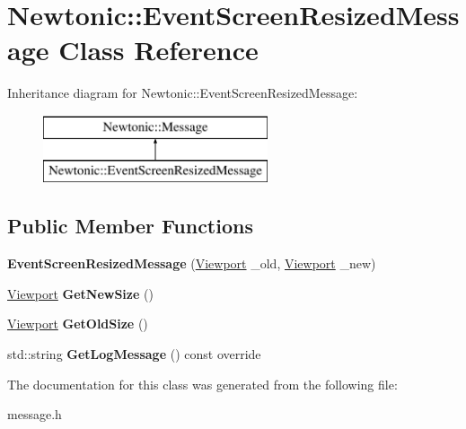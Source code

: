 \hypertarget{classNewtonic_1_1EventScreenResizedMessage}{}\section{Newtonic\+::Event\+Screen\+Resized\+Message Class Reference}
\label{classNewtonic_1_1EventScreenResizedMessage}
Inheritance diagram for Newtonic\+::Event\+Screen\+Resized\+Message\+:\begin{figure}[H]
\begin{center}
\leavevmode
\includegraphics[height=2.000000cm]{classNewtonic_1_1EventScreenResizedMessage}
\end{center}
\end{figure}
\subsection*{Public Member Functions}
\begin{DoxyCompactItemize}
\item 
\mbox{\label{classNewtonic_1_1EventScreenResizedMessage_ae2632064d40965513216267f1aea7c89}} 
{\bfseries Event\+Screen\+Resized\+Message} (\mbox{\hyperlink{structNewtonic_1_1Viewport}{Viewport}} \+\_\+old, \mbox{\hyperlink{structNewtonic_1_1Viewport}{Viewport}} \+\_\+new)
\item 
\mbox{\label{classNewtonic_1_1EventScreenResizedMessage_a18035761e0b2571fbd9c79f1691185ee}} 
\mbox{\hyperlink{structNewtonic_1_1Viewport}{Viewport}} {\bfseries Get\+New\+Size} ()
\item 
\mbox{\label{classNewtonic_1_1EventScreenResizedMessage_ae6350d25ddf3704a52df0d1ac1f291f6}} 
\mbox{\hyperlink{structNewtonic_1_1Viewport}{Viewport}} {\bfseries Get\+Old\+Size} ()
\item 
\mbox{\label{classNewtonic_1_1EventScreenResizedMessage_a136456e684f8522ac7e4316de39690f6}} 
std\+::string {\bfseries Get\+Log\+Message} () const override
\end{DoxyCompactItemize}


The documentation for this class was generated from the following file\+:\begin{DoxyCompactItemize}
\item 
message.\+h\end{DoxyCompactItemize}
